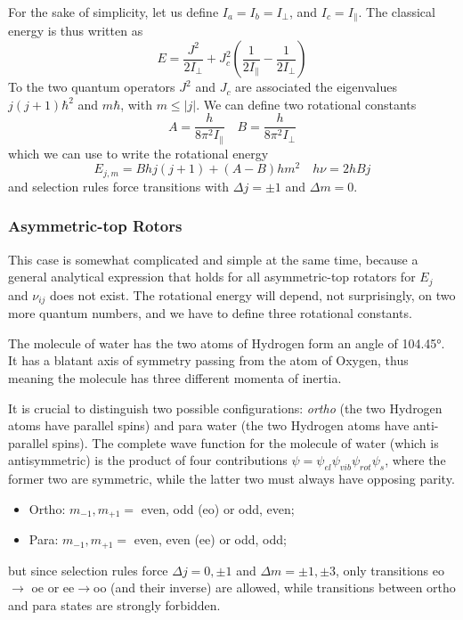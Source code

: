 For the sake of simplicity, let us define $I_{a} = I_{b} = I_{\perp}$, and $I_{c} = I_{\parallel}$. The classical energy is thus written as 
\begin{equation*}
    E = \frac{J^{2}}{2I_{\perp}} + J_{c}^{2}\left(\frac{1}{2I_{\parallel}} - \frac{1}{2I_{\perp}}\right)
\end{equation*}
To the two quantum operators $J^{2}$ and $J_{c}$ are associated the eigenvalues $j(j+1)\hbar^{2}$ and $m\hbar$, with $m \leq |j|$. We can define two rotational constants 
\begin{equation*}
    A = \frac{h}{8\pi^{2}I_{\parallel}} \quad B = \frac{h}{8\pi^{2}I_{\perp}}
\end{equation*}
which we can use to write the rotational energy
\begin{equation}
    E_{j,m} = Bhj(j+1) + (A-B)hm^{2} \quad h\nu = 2hBj
    \label{eq:symmetrictoprotors}
\end{equation}
and selection rules force transitions with $\Delta j = \pm 1$ and $\Delta m = 0$.

\subsubsection{Asymmetric-top Rotors}

This case is somewhat complicated and simple at the same time, because a general analytical expression that holds for all asymmetric-top rotators for $E_{j}$ and $\nu_{ij}$ does not exist. The rotational energy will depend, not surprisingly, on two more quantum numbers, and we have to define three rotational constants.

\begin{tcolorbox}[enhanced,attach boxed title to top center={yshift=-3mm,yshifttext=-1mm},
  colback=blue!5!white,colframe=blue!75!black,colbacktitle=blue!80!black,
  title=Example: H$_{2}$O,
  boxed title style={size=small,colframe=blue!50!black}]
  The molecule of water has the two atoms of Hydrogen form an angle of 104.45°. It has a blatant axis of symmetry passing from the atom of Oxygen, thus meaning the molecule has three different momenta of inertia.
  \par It is crucial to distinguish two possible configurations: \emph{ortho} (the two Hydrogen atoms have parallel spins) and para water (the two Hydrogen atoms have anti-parallel spins). The complete wave function for the molecule of water (which is antisymmetric) is the product of four contributions $\psi = \psi_{el}\psi_{vib}\psi_{rot}\psi_{s}$, where the former two are symmetric, while the latter two must always have opposing parity.
  \begin{itemize}
    \item Ortho: $m_{-1}, m_{+1} = $ even, odd (eo) or odd, even;
    \item Para: $m_{-1}, m_{+1} = $ even, even (ee) or odd, odd;
  \end{itemize}
  but since selection rules force $\Delta j = 0,\pm 1$ and $\Delta m = \pm 1, \pm 3$, only transitions eo $\to$ oe or ee$\to$oo (and their inverse) are allowed, while transitions between ortho and para states are strongly forbidden.
\end{tcolorbox}

